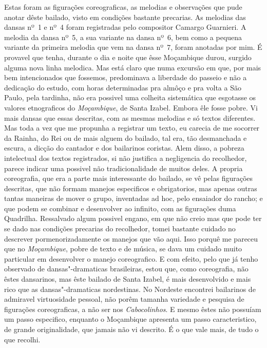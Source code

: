 Estas foram as figurações coreograficas, as melodias e observações que
pude anotar dêste bailado, visto em condições bastante precarias. As
melodias das dansas nº~1 e nº~4 foram registradas pelo compositor
Camargo Guarnieri. A melodia da dansa nº~5, a sua variante na dansa nº~6, bem como a pequena variante da primeira melodia que vem na dansa nº~7, foram anotadas por mim. É provavel que tenha, durante o dia e noite
que êsse Moçambique durou, surgido alguma nova linha melodica. Mas está
claro que numa excursão em que, por mais bem intencionados que fossemos,
predominava a liberdade do passeio e não a dedicação do estudo, com
horas determinadas pra almôço e pra volta a São Paulo, pela tardinha,
não era possivel uma colheita sistemática que esgotasse os valores
etnograficos do \emph{Moçambique}, de Santa Izabel. Embora êle fosse
pobre. Vi mais dansas que essas descritas, com as mesmas melodias e só
textos diferentes. Mas toda a vez que me propunha a registrar um texto,
eu carecia de me socorrer da Rainha, do Rei ou de mais alguem do
bailado, tal era, tão desmanchada e escura, a dicção do cantador e dos
bailarinos coristas. Alem disso, a pobreza intelectual dos textos
registrados, si não justifica a negligencia do recolhedor, parece
indicar uma possivel não tradicionalidade de muitos deles. A propria
coreografia, que era a parte mais interessante do bailado, se vê pelas
figurações descritas, que não formam manejos especificos e obrigatorios,
mas apenas outras tantas maneiras de mover o grupo, inventadas ad hoc,
pelo ensaiador do rancho; e que podem se combinar e desenvolver ao
infinito, com as figurações duma Quadrilha. Ressalvado algum possivel
engano, em que não creio mas que pode ter se dado nas condições
precarias do recolhedor, tomei bastante cuidado no descrever
pormenorizadamente os manejos que vão aqui. Isso porquê me pareceu que
no \emph{Moçambique}, pobre de texto e de música, se dava um cuidado
muito particular em desenvolver o manejo coreografico. E com efeito,
pelo que já tenho observado de dansas"-dramaticas brasileiras, estou que,
como coreografia, não êstes dansarinos, mas êste bailado de Santa
Izabel, é mais desenvolvido e mais rico que as dansas"-dramaticas
nordestinas. No Nordeste encontrei bailarinos de admiravel virtuosidade
pessoal, não porêm tamanha variedade e pesquisa de figurações
coreograficas, a não ser nos \emph{Cabocolinhos}. E mesmo êstes não
possuíam um passo especifico, enquanto o Moçambique apresenta um passo
caracteristico, de grande originalidade, que jamais não vi descrito. É o
que vale mais, de tudo o que recolhi.

